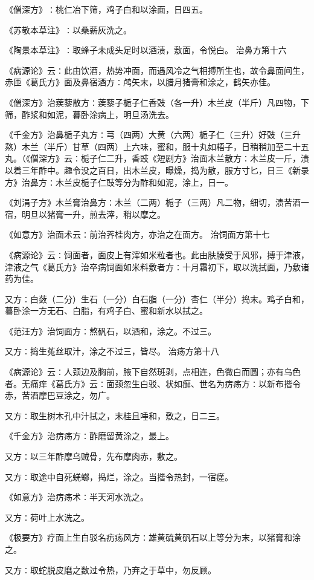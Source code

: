 \documentclass[a4paper,12pt,UTF8,twoside]{ctexbook}
\begin{document}
《僧深方》∶桃仁冶下筛，鸡子白和以涂面，日四五。

《苏敬本草注》∶以桑薪灰洗之。

《陶景本草注》∶取蜂子未成头足时以酒渍，敷面，令悦白。
治鼻方第十六

《病源论》云∶此由饮酒，热势冲面，而遇风冷之气相搏所生也，故令鼻面间生，赤匝《葛氏方》面及鼻宿酒方∶鸬矢末，以腊月猪膏和涂之，鹤矢亦佳。

《僧深方》治蒺藜散方∶蒺藜子栀子仁香豉（各一升）木兰皮（半斤）凡四物，下筛，酢浆和如泥，暮卧涂病上，明旦汤洗去。

《千金方》治鼻栀子丸方∶芎（四两）大黄（六两）栀子仁（三升）好豉（三升熬）木兰（半斤）甘草（四两）上六味，蜜和，服十丸如梧子，日稍稍加至二十五丸。（《僧深方》云∶栀子仁二升，香豉《短剧方》治面木兰散方∶木兰皮一斤，渍以着三年酢中。趣令没之百日，出木兰皮，曝燥，捣为散，服方寸匕，日三《新录方》治鼻方∶木兰皮栀子仁豉等分为酢和如泥，涂上，日一。

《刘涓子方》木兰膏治鼻方∶木兰（二两）栀子（三两）凡二物，细切，渍苦酒一宿，明旦以猪膏一升，煎去滓，稍以摩之。

《如意方》治面术云∶前治荠桂肉方，亦治之在面方。
治饲面方第十七

《病源论》云∶饲面者，面皮上有滓如米粒者也。此由肤腠受于风邪，搏于津液，津液之气《葛氏方》治卒病饲面如米料敷者方∶十月霜初下，取以洗拭面，乃敷诸药为佳。

又方∶白蔹（二分）生石（一分）白石脂（一分）杏仁（半分）捣末。鸡子白和，暮卧涂一方无石、白脂，有鸡子白、蜜和新水以拭之。

《范汪方》治饲面方∶熬矾石，以酒和，涂之。不过三。

又方∶捣生菟丝取汁，涂之不过三，皆尽。
治疡方第十八

《病源论》云∶人颈边及胸前，腋下自然斑剥，点相连，色微白而圆；亦有乌色者。无痛痒《葛氏方》云∶面颈忽生白驳、状如癣、世名为疠疡方∶以新布揩令赤，苦酒摩巴豆涂之，勿广。

又方∶取生树木孔中汁拭之，末桂且唾和，敷之，日二三。

《千金方》治疠疡方∶酢磨留黄涂之，最上。

又方∶以三年酢摩乌贼骨，先布摩肉赤，敷之。

又方∶取途中自死蜣螂，捣烂，涂之。当揩令热封，一宿瘥。

《如意方》治疠疡术∶半天河水洗之。

又方∶荷叶上水洗之。

《极要方》疗面上生白驳名疠疡风方∶雄黄硫黄矾石以上等分为末，以猪膏和涂之。

又方∶取蛇脱皮磨之数过令热，乃弃之于草中，勿反顾。
\end{document}
